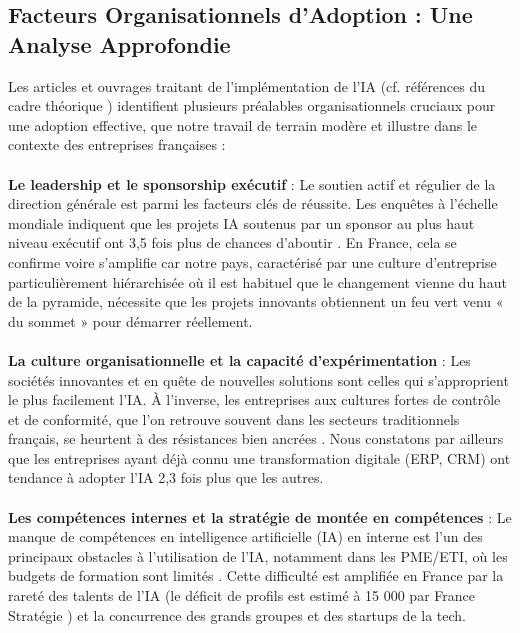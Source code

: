 \subsection{Facteurs Organisationnels d'Adoption : Une Analyse Approfondie}

Les articles et ouvrages traitant de l'implémentation de l'IA (cf. références du cadre théorique \cite{davis1989perceived, artimon2025theorie, psicosmart2024resistance, vorecol2024resistance, chen2024airam}) identifient plusieurs préalables organisationnels cruciaux pour une adoption effective, que notre travail de terrain modère et illustre dans le contexte des entreprises françaises :
\\\\
\textbf{Le leadership et le sponsorship exécutif} : Le soutien actif et régulier de la direction générale est parmi les facteurs clés de réussite. Les enquêtes à l’échelle mondiale indiquent que les projets IA soutenus par un sponsor au plus haut niveau exécutif ont 3,5 fois plus de chances d’aboutir \cite{capgemini2024ai_france}. En France, cela se confirme voire s’amplifie car notre pays, caractérisé par une culture d’entreprise particulièrement hiérarchisée où il est habituel que le changement vienne du haut de la pyramide, nécessite que les projets innovants obtiennent un feu vert venu « du sommet » pour démarrer réellement.
\\\\
\textbf{La culture organisationnelle et la capacité d'expérimentation} : Les sociétés innovantes et en quête de nouvelles solutions sont celles qui s’approprient le plus facilement l’IA. À l’inverse, les entreprises aux cultures fortes de contrôle et de conformité, que l’on retrouve souvent dans les secteurs traditionnels français, se heurtent à des résistances bien ancrées \cite{teece2007dynamic}. Nous constatons par ailleurs que les entreprises ayant déjà connu une transformation digitale (ERP, CRM) ont tendance à adopter l’IA 2,3 fois plus que les autres.
\\\\
\textbf{Les compétences internes et la stratégie de montée en compétences} : Le manque de compétences en intelligence artificielle (IA) en interne est l'un des principaux obstacles à l'utilisation de l'IA, notamment dans les PME/ETI, où les budgets de formation sont limités \cite{bpifrance2025ia}. Cette difficulté est amplifiée en France par la rareté des talents de l'IA (le déficit de profils est estimé à 15 000 par France Stratégie \cite{france_strategie2025make}) et la concurrence des grands groupes et des startups de la tech.
